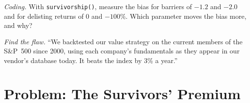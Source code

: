 \begin{exercise}[$\star\star\star$]\label{exo:rs:point-in-time-data-and-the-biases:7}
\emph{Coding.} With \texttt{survivorship()}, measure the bias for barriers of $-1.2$ and $-2.0$ and for delisting returns of $0$
and $-100\%$. Which parameter moves the bias more, and why?
\end{exercise}

\begin{exercise}[$\star\star\star$]\label{exo:rs:point-in-time-data-and-the-biases:8}
\emph{Find the flaw.} ``We backtested our value strategy on the current members of the S\&P~500 since 2000, using each company's
fundamentals as they appear in our vendor's database today. It beats the index by 3\% a year.''
\end{exercise}

\section{Problem: The Survivors' Premium}

